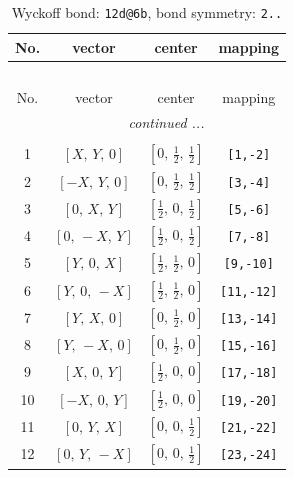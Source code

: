 \documentclass[fleqn,8pt]{jsarticle}
\begin{document}
\begin{longtable}{cccc}
\caption{Wyckoff bond: {\tt 12d@6b}, bond symmetry: {\tt 2..}}
 \\
 \hline \hline
No. & vector & center & mapping \\ \hline \endfirsthead

\multicolumn{3}{l}{\tablename\ \thetable{}} \\
 \hline \hline
No. & vector & center & mapping \\ \hline \endhead

 \hline \hline
\multicolumn{3}{r}{\footnotesize\it continued ...} \\ \endfoot

 \hline \hline
\multicolumn{3}{r}{} \\ \endlastfoot

1 & $\left[ X,\, Y,\, 0 \right]$ & $\left[ 0,\, \frac{1}{2},\, \frac{1}{2} \right]$ & {\tt [1,-2]} \\ \hline
2 & $\left[ - X,\, Y,\, 0 \right]$ & $\left[ 0,\, \frac{1}{2},\, \frac{1}{2} \right]$ & {\tt [3,-4]} \\ \hline
3 & $\left[ 0,\, X,\, Y \right]$ & $\left[ \frac{1}{2},\, 0,\, \frac{1}{2} \right]$ & {\tt [5,-6]} \\ \hline
4 & $\left[ 0,\, - X,\, Y \right]$ & $\left[ \frac{1}{2},\, 0,\, \frac{1}{2} \right]$ & {\tt [7,-8]} \\ \hline
5 & $\left[ Y,\, 0,\, X \right]$ & $\left[ \frac{1}{2},\, \frac{1}{2},\, 0 \right]$ & {\tt [9,-10]} \\ \hline
6 & $\left[ Y,\, 0,\, - X \right]$ & $\left[ \frac{1}{2},\, \frac{1}{2},\, 0 \right]$ & {\tt [11,-12]} \\ \hline
7 & $\left[ Y,\, X,\, 0 \right]$ & $\left[ 0,\, \frac{1}{2},\, 0 \right]$ & {\tt [13,-14]} \\ \hline
8 & $\left[ Y,\, - X,\, 0 \right]$ & $\left[ 0,\, \frac{1}{2},\, 0 \right]$ & {\tt [15,-16]} \\ \hline
9 & $\left[ X,\, 0,\, Y \right]$ & $\left[ \frac{1}{2},\, 0,\, 0 \right]$ & {\tt [17,-18]} \\ \hline
10 & $\left[ - X,\, 0,\, Y \right]$ & $\left[ \frac{1}{2},\, 0,\, 0 \right]$ & {\tt [19,-20]} \\ \hline
11 & $\left[ 0,\, Y,\, X \right]$ & $\left[ 0,\, 0,\, \frac{1}{2} \right]$ & {\tt [21,-22]} \\ \hline
12 & $\left[ 0,\, Y,\, - X \right]$ & $\left[ 0,\, 0,\, \frac{1}{2} \right]$ & {\tt [23,-24]} \\
\end{longtable}
\end{document}
